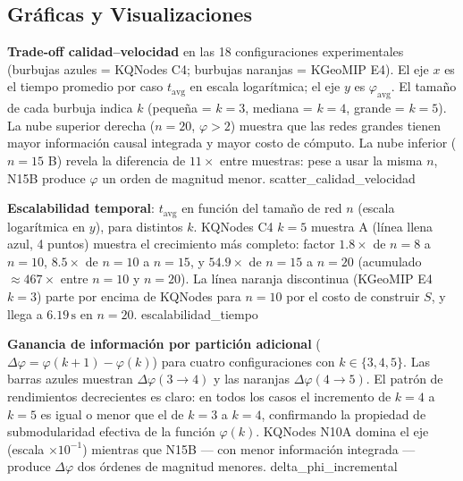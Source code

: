 \subsection{Gráficas y Visualizaciones}

%
  {\textbf{Trade-off calidad--velocidad} en las 18 configuraciones experimentales
   (burbujas azules = KQNodes C4; burbujas naranjas = KGeoMIP E4).
   El eje $x$ es el tiempo promedio por caso $t_{\mathrm{avg}}$ en escala
   logarítmica; el eje $y$ es $\varphi_{\mathrm{avg}}$.
   El tamaño de cada burbuja indica $k$ (pequeña = $k=3$, mediana = $k=4$,
   grande = $k=5$).
   La nube superior derecha ($n=20$, $\varphi > 2$) muestra que las redes
   grandes tienen mayor información causal integrada y mayor costo de cómputo.
   La nube inferior ($n=15$ B) revela la diferencia de $11\times$ entre
   muestras: pese a usar la misma $n$, N15B produce $\varphi$ un orden de
   magnitud menor.}%
  {scatter_calidad_velocidad}

%
  {\textbf{Escalabilidad temporal}: $t_{\mathrm{avg}}$ en función del
   tamaño de red $n$ (escala logarítmica en $y$), para distintos $k$.
   KQNodes C4 $k=5$ muestra A (línea llena azul, 4 puntos) muestra el
   crecimiento más completo: factor $1.8\times$ de $n=8$ a $n=10$,
   $8.5\times$ de $n=10$ a $n=15$, y $54.9\times$ de $n=15$ a $n=20$
   (acumulado $\approx 467\times$ entre $n=10$ y $n=20$).
   La línea naranja discontinua (KGeoMIP E4 $k=3$) parte por encima de
   KQNodes para $n=10$ por el costo de construir $S$, y llega a
   $6.19\,\mathrm{s}$ en $n=20$.}%
  {escalabilidad_tiempo}

%
  {\textbf{Ganancia de información por partición adicional}
   ($\Delta\varphi = \varphi(k{+}1) - \varphi(k)$) para cuatro
   configuraciones con $k \in \{3,4,5\}$.
   Las barras azules muestran $\Delta\varphi(3{\to}4)$ y las naranjas
   $\Delta\varphi(4{\to}5)$.
   El patrón de rendimientos decrecientes es claro: en todos los casos
   el incremento de $k=4$ a $k=5$ es igual o menor que el de $k=3$ a
   $k=4$, confirmando la propiedad de submodularidad efectiva de la
   función $\varphi(k)$.
   KQNodes N10A domina el eje (escala $\times 10^{-1}$) mientras que
   N15B --- con menor información integrada --- produce $\Delta\varphi$
   dos órdenes de magnitud menores.}%
  {delta_phi_incremental}

